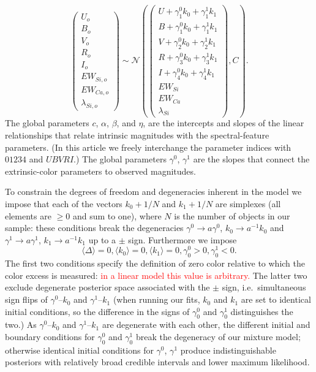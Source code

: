 \documentclass{aastex61}   	%
\begin{document}
\begin{equation}
\begin{pmatrix}
U_o\\B_o\\ V_o\\R_o\\I_o\\EW_{Si, o}\\ EW_{Ca, o} \\ \lambda_{Si, o}
\end{pmatrix}
\sim \mathcal{N}
\left(
\begin{pmatrix}
U +\gamma^0_{1} k_0 +\gamma^1_{1} k_1 \\B +\gamma^0_{1} k_0 +\gamma^1_{1} k_1 \\
V+\gamma^0_{2} k_0+\gamma^1_{2} k_1\\R+\gamma^0_{3} k_0 + \gamma^1_{3} k_1\\I+\gamma^0_{4} k_0+\gamma^1_{4} k_1\\
EW_{Si}\\ EW_{Ca} \\ \lambda_{Si}
\end{pmatrix}
,C
\right).
\label{dust:eqn}
\end{equation}
The global parameters $c$, $\alpha$, $\beta$,  and $\eta$,  are the intercepts and slopes of the linear relationships that
relate intrinsic magnitudes with the spectral-feature parameters.
(In this article we freely interchange the parameter indices with  $01234$ and $UBVRI$.)
The global parameters $\gamma^0$, $\gamma^1$  are the slopes that connect the extrinsic-color
parameters to observed magnitudes.

To constrain the degrees of freedom and degeneracies inherent in the model we impose that
\color{red}
each of the vectors $k_0+1/N$ and $k_1+1/N$ are simplexes (all elements are $\ge 0$ and sum to one),
where $N$ is the number of objects in our sample: these
conditions break the 
degeneracies  $\gamma ^0\rightarrow a\gamma^0$, $k_0 \rightarrow a^{-1}k_0$ and $\gamma^1 \rightarrow a\gamma^1$, $k_1 \rightarrow a^{-1}k_1$
up to a $\pm$ sign.
Furthermore we impose
\color{black} 
\begin{equation}
\langle \Delta \rangle=0, \langle k_0 \rangle=0, \langle k_1 \rangle=0, \gamma^0_0 > 0, \gamma^1_0 < 0.
\end{equation}
The first two conditions specify the definition of zero color relative to which the color excess is measured:
\textcolor{red}{in a linear model this value is arbitrary.} 
The latter two exclude degenerate posterior space
associated
with the $\pm$ sign, i.e.\ simultaneous sign flips of
$\gamma^0$--$k_0$ and $\gamma^1$--$k_1$
\color{red}
(when running our fits, $k_0$ and $k_1$ are set to
identical initial conditions, so the difference in the signs of $\gamma^0_0$ and $\gamma^1_0$ distinguishes the two.)
As  $\gamma^0$--$k_0$ and $\gamma^1$--$k_1$ are degenerate with
each other,
the different initial and boundary conditions for $\gamma^0_0$ and $\gamma^1_0$ break the degeneracy of our mixture model;
otherwise identical initial conditions for $\gamma^0$, $\gamma^1$ produce indistinguishable posteriors
with relatively broad credible intervals and lower maximum likelihood.
\end{document}
